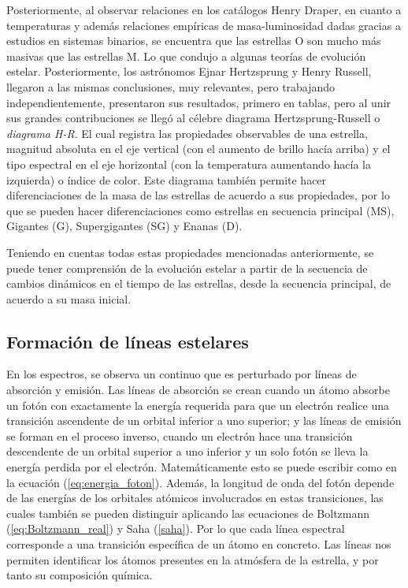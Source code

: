 \documentclass[12pt,oneside,openany,letter]{book}
\begin{document}
\noindent Posteriormente, al observar relaciones en los catálogos Henry Draper, en cuanto a temperaturas y además relaciones empíricas de masa-luminosidad dadas gracias a estudios en sistemas binarios, se encuentra que las estrellas O son mucho más masivas que las estrellas M. Lo que condujo a algunas teorías de evolución estelar. Posteriormente, los astrónomos Ejnar Hertzsprung y Henry Russell, llegaron a las mismas conclusiones, muy relevantes, pero trabajando independientemente, presentaron sus resultados, primero en tablas, pero al unir sus grandes contribuciones se llegó al célebre diagrama Hertzsprung-Russell o  \textit{diagrama H-R}. El cual registra las propiedades observables de una estrella, magnitud absoluta en el eje vertical (con el aumento de brillo hacía arriba) y el tipo espectral en el eje horizontal (con la temperatura aumentando hacía la izquierda) o índice de color. Este diagrama también permite hacer diferenciaciones de la masa de las estrellas de acuerdo a sus propiedades, por lo que se pueden hacer diferenciaciones como estrellas en secuencia principal (MS), Gigantes (G), Supergigantes (SG) y Enanas (D).
\vspace{2mm}

\noindent Teniendo en cuentas todas estas propiedades mencionadas anteriormente, se puede tener comprensión de la evolución estelar a partir de la secuencia de cambios dinámicos en el tiempo de las estrellas, desde la secuencia principal, de acuerdo a su masa inicial.

\subsection{Formación de líneas estelares}
En los espectros, se observa un continuo que es perturbado por líneas de absorción y emisión. Las líneas de absorción se crean cuando un átomo absorbe un fotón con exactamente la energía requerida para que un electrón realice una transición ascendente de un orbital inferior a uno superior; y las líneas de emisión se forman en el proceso inverso, cuando un electrón hace una transición descendente de un orbital superior a uno inferior y un solo fotón se lleva la energía perdida por el electrón.  Matemáticamente esto se puede escribir como en la ecuación (\ref{eq:energia_foton}). Además, la longitud de onda del fotón depende de las energías de los orbitales atómicos involucrados en estas transiciones, las cuales también se pueden distinguir aplicando las ecuaciones de Boltzmann (\ref{eq:Boltzmann_real}) y Saha (\ref{saha}). Por lo que cada línea espectral corresponde a una transición específica de un átomo en concreto. Las líneas nos permiten identificar los átomos presentes en la atmósfera de la estrella, y por tanto su composición química.
\end{document}
